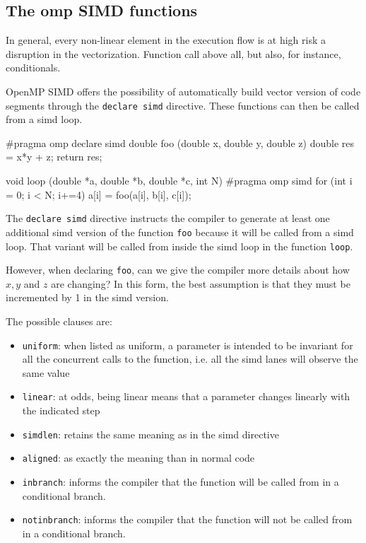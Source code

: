 \subsection{The omp SIMD functions}

In general, every non-linear element in the execution flow is at high risk a disruption in the vectorization. Function call above all, but also, for instance, conditionals.

OpenMP SIMD offers the possibility of automatically build vector version of code segments through the \texttt{declare simd} directive. These functions can then be called from a simd loop. 
\begin{codeblock}[language=C]
#pragma omp declare simd 
double foo (double x, double y, double z) {
    double res = x*y + z;
    return res;
}

void loop (double *a, double *b, double *c, int N){
    #pragma omp simd 
    for (int i = 0; i < N; i+=4) {
        a[i] = foo(a[i], b[i], c[i]);
    }
}
\end{codeblock}

The \texttt{declare simd} directive instructs the compiler to generate at least one additional simd version of the function \texttt{foo} because it will be called from a simd loop. That variant will be called from inside the simd loop in the function \texttt{loop}. 

However, when declaring \texttt{foo}, can we give the compiler more details about how $x,y$ and $z$ are changing? In this form, the best assumption is that they must be incremented by 1 in the simd version.

The possible clauses are:

\begin{itemize}
    \item \texttt{uniform}: when listed as uniform, a parameter is intended to be invariant for all the concurrent calls to the function, i.e. all the simd lanes will observe the same value
    \item \texttt{linear}: at odds, being linear means that a parameter changes linearly with the indicated step
    \item \texttt{simdlen}: retains the same meaning as in the simd directive
    \item \texttt{aligned}: as exactly the meaning than in normal code
    \item \texttt{inbranch}: informs the compiler that the function will be called from in a conditional branch.
    \item \texttt{notinbranch}: informs the compiler that the function will not be called from in a conditional branch.
\end{itemize}


